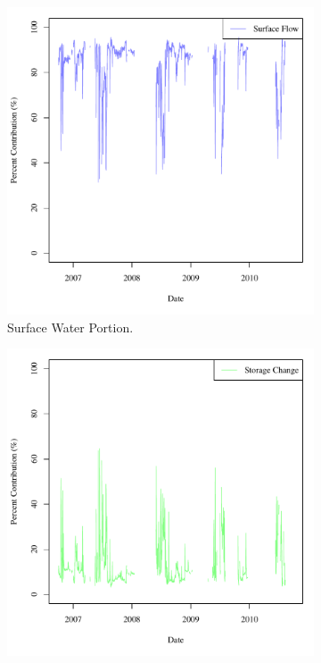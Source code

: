 \begin{linenumbers}
\begin{figure}[htbp]
	\centering
	\begin{subfigure}{0.5\textwidth}
		\centering
		\includegraphics[width=\tableCustomSize]{"Figures/Results_DSR/Stochastic/M Water Contrib 1"}
		\caption{Surface Water Portion.}
	\end{subfigure}%
	\begin{subfigure}{0.5\textwidth}
		\centering
		\includegraphics[width=\tableCustomSize]{"Figures/Results_DSR/Stochastic/M Water Contrib 3"}

\end{subfigure}
\end{figure}
\end{linenumbers}
